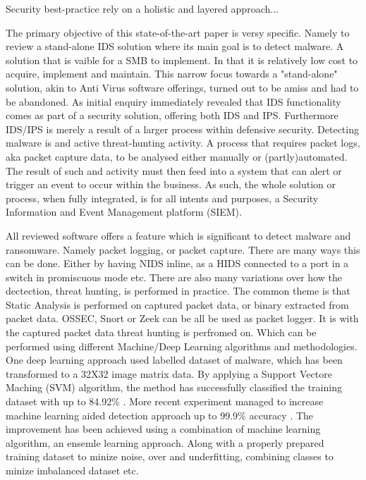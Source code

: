 Security best-practice rely on a holistic and layered approach...

The primary objective of this state-of-the-art paper is versy specific. Namely to review a stand-alone IDS solution where its main goal is to detect malware. A solution that is vaible for a SMB to implement. In that it is relatively low cost to acquire, implement and maintain. This narrow focus towards a "stand-alone" solution, akin to Anti Virus software offerings, turned out to be amiss and had to be abandoned. As initial enquiry immediately revealed that IDS functionality comes as part of a security solution, offering both IDS and IPS. Furthermore IDS/IPS is merely a result of a larger process within defensive security. Detecting malware is and active threat-hunting activity. A process that requires packet logs, aka packet capture data, to be analysed either manually or (partly)automated. The result of such and activity must then feed into a system that can alert or trigger an event to occur within the business. As such, the whole solution or process, when fully integrated, is for all intents and purposes, a Security Information and Event Management platform (SIEM).

All reviewed software offers a feature which is significant to detect malware and ransomware. Namely packet logging, or packet capture. There are many ways this can be done. Either by having NIDS inline, as a HIDS connected to a port in a switch in promiscuous mode etc. There are also many variations over how the dectection, threat hunting, is performed in practice. The common theme is that Static Analysis is performed on captured packet data, or binary extracted from packet data. OSSEC, Snort or Zeek can be all be used as packet logger. It is with the captured packet data threat hunting is perfromed on. Which can be performed using different Machine/Deep Learning algorithms and methodologies. One deep learning approach used labelled dataset of malware, which has been transformed to a 32X32 image matrix data. By applying a Support Vectore Maching (SVM) algorithm, the method has successfully classified the training dataset with up to 84.92\% \cite{322221656}. More recent experiment managed to increase machine learning aided detection approach up to 99.9\% accuracy \cite{358776502}. The improvement has been achieved using a combination of machine learning algorithm, an ensemle learning approach. Along with a properly prepared training dataset to minize noise, over and underfitting, combining classes to minize imbalanced dataset etc.

